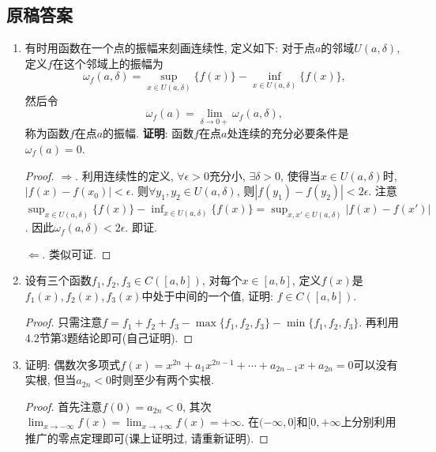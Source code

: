 \documentclass[UTF8,11pt, a4paper, oneside, fontset=none]{ctexbook}
\begin{document}
\clearpage

\subsection*{原稿答案}

\begin{enumerate}

\item 有时用函数在一个点的振幅来刻画连续性, 定义如下: 对于点$a$的邻域$U(a, \delta)$, 定义$f$在这个邻域上的振幅为
\[
\omega_f(a, \delta) = \sup_{x \in U(a, \delta)}\{ f(x)\} - \inf_{x \in U(a, \delta)}\{ f(x)\},
\]
然后令
\[
\omega_f(a) = \lim_{\delta \to 0+} \omega_f(a, \delta),
\]
称为函数$f$在点$a$的振幅. {\bf 证明}: 函数$f$在点$a$处连续的充分必要条件是$\omega_f(a) =0$.
 
 
 \begin{proof}

$\Rightarrow$. 利用连续性的定义, $\forall \epsilon>0$充分小, $\exists \delta>0$, 使得当$x \in U(a, \delta)$时, $|f(x) - f(x_0)| < \epsilon$. 则$\forall y_1, y_2 \in U(a, \delta)$, 则$|f(y_1) - f(y_2)|  < 2 \epsilon$. 注意$\sup_{x \in U(a, \delta)}\{ f(x)\} - \inf_{x \in U(a, \delta)}\{ f(x)\} = \sup_{x, x' \in U(a, \delta)} |f(x) - f(x')|$. 因此$\omega_f(a, \delta) < 2\epsilon$. 即证. 

$\Leftarrow$. 类似可证.

\end{proof}


\item 设有三个函数$f_1, f_2, f_3 \in C([a, b])$, 对每个$x \in [a, b]$, 定义$f(x)$是$f_1(x), f_2(x), f_3(x)$中处于中间的一个值, 证明: $f \in C([a, b])$.


\begin{proof}

只需注意$f = f_1 + f_2 + f_3 - \max\{ f_1, f_2, f_3\} - \min\{ f_1, f_2, f_3\}$. 再利用4.2节第3题结论即可(自己证明).

\end{proof}


\item 证明: 偶数次多项式$f(x) = x^{2n} + a_1 x^{2n-1} + \cdots + a_{2n-1} x + a_{2n} = 0$可以没有实根, 但当$a_{2n}<0$时则至少有两个实根.


\begin{proof}

首先注意$f(0) =a_{2n} < 0$, 其次$\lim_{x \to -\infty} f(x) = \lim_{x \to +\infty}f(x) = +\infty$. 在$(-\infty, 0]$和$[0, +\infty$上分别利用推广的零点定理即可(课上证明过, 请重新证明).



\end{proof}
\end{enumerate}
\end{document}
